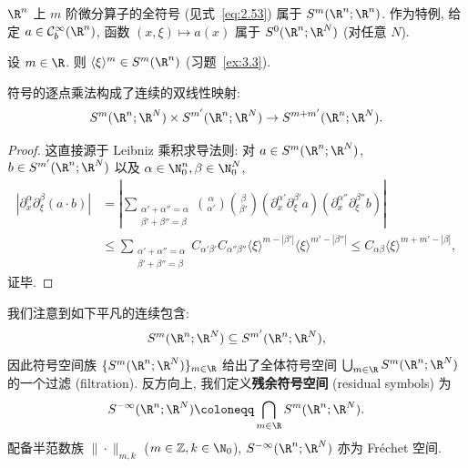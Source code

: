 \begin{example}[符号, I]\label{eg:3.6}
$\R^n$ 上 $m$ 阶微分算子的全符号 (见式~\eqref{eq:2.53}) 属于 $S^m(\R^n; \R^n)$. 作为特例, 给定 $a \in \mathcal{C}_b^\infty(\R^n)$, 函数 $(x, \xi) \mapsto a(x)$ 属于 $S^0(\R^n; \R^N)$ (对任意 $N$).
\end{example}

\begin{example}[符号, II]\label{eg:3.7}
设 $m \in \R$. 则 $\langle \xi \rangle^m \in S^m(\R^n)$ (习题~\ref{ex:3.3}).
\end{example}

\begin{proposition}[符号的逐点乘积]\label{prop:3.8}
符号的逐点乘法构成了连续的双线性映射:
\begin{equation}\label{eq:3.15}
    S^m(\R^n; \R^N) \times S^{m'}(\R^n; \R^N) \to S^{m+m'}(\R^n; \R^N).
\end{equation}
\end{proposition}

\begin{proof}
这直接源于 Leibniz 乘积求导法则: 对 $a \in S^m(\R^n; \R^N)$, $b \in S^{m'}(\R^n; \R^N)$ 以及 $\alpha \in \N_0^n, \beta \in \N_0^N$,
\[
    \begin{aligned}
        |\partial_x^\alpha \partial_\xi^\beta (a \cdot b)| &= \left| \sum_{\substack{\alpha' + \alpha'' = \alpha \\ \beta' + \beta'' = \beta}} \binom{\alpha}{\alpha'} \binom{\beta}{\beta'} (\partial_x^{\alpha'} \partial_\xi^{\beta'} a) (\partial_x^{\alpha''} \partial_\xi^{\beta''} b) \right| \\
        &\le \sum_{\substack{\alpha' + \alpha'' = \alpha \\ \beta' + \beta'' = \beta}} C_{\alpha' \beta'} C_{\alpha'' \beta''} \langle \xi \rangle^{m - |\beta'|} \langle \xi \rangle^{m' - |\beta''|} \le C_{\alpha\beta} \langle \xi \rangle^{m + m' - |\beta|},
    \end{aligned}
\]
证毕.
\end{proof}

我们注意到如下平凡的连续包含:
\begin{equation}\label{eq:3.16}
    S^m(\R^n; \R^N) \subseteq S^{m'}(\R^n; \R^N),
\end{equation}
因此符号空间族 $\{S^m(\R^n; \R^N)\}_{m \in \R}$ 给出了全体符号空间 $\bigcup_{m \in \R} S^m(\R^n; \R^N)$ 的一个过滤 (filtration). 反方向上, 我们定义\textbf{残余符号空间} (residual symbols) 为
\begin{equation}\label{eq:3.17}
    S^{-\infty}(\R^n; \R^N) \defeq \bigcap_{m \in \R} S^m(\R^n; \R^N).
\end{equation}
配备半范数族 $\|\cdot\|_{m, k}$ ($m \in \mathbb{Z}, k \in \N_0$), $S^{-\infty}(\R^n; \R^N)$ 亦为 Fréchet 空间.

